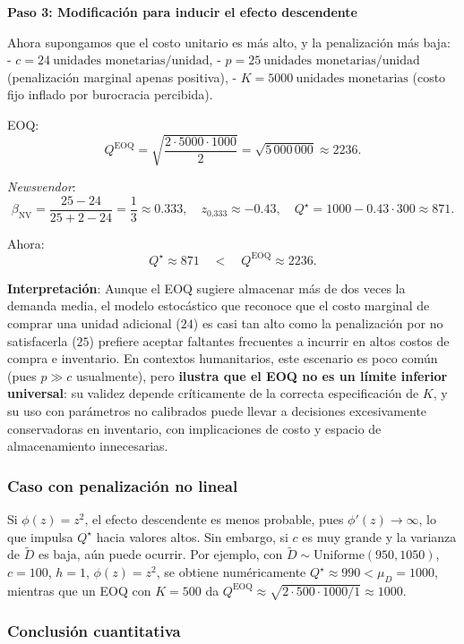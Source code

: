 \documentclass[
  spanish,
  us-letterpaper,
  DIV=11,
  numbers=noendperiod]{scrreprt}
\numberwithin{equation}{section}
\begin{document}
\textbf{Paso 3: Modificación para inducir el efecto descendente}

Ahora supongamos que el costo unitario es más alto, y la penalización
más baja: - \(c = 24~\text{unidades monetarias/unidad}\), -
\(p = 25~\text{unidades monetarias/unidad}\) (penalización marginal
apenas positiva), - \(K = 5000~\text{unidades monetarias}\) (costo fijo
inflado por burocracia percibida).

EOQ: \[
Q^{\text{EOQ}} = \sqrt{\frac{2 \cdot 5000 \cdot 1000}{2}} = \sqrt{5\,000\,000} \approx 2236.
\]

\emph{Newsvendor}: \[
\beta_{\text{NV}} = \frac{25 - 24}{25 + 2 - 24} = \frac{1}{3} \approx 0.333,
\quad z_{0.333} \approx -0.43,
\quad Q^\star = 1000 - 0.43 \cdot 300 \approx 871.
\]

Ahora: \[
Q^\star \approx 871 \quad < \quad Q^{\text{EOQ}} \approx 2236.
\]

\textbf{Interpretación}: Aunque el EOQ sugiere almacenar más de dos
veces la demanda media, el modelo estocástico que reconoce que el costo
marginal de comprar una unidad adicional (\(24\)) es casi tan alto como
la penalización por no satisfacerla (\(25\)) prefiere aceptar faltantes
frecuentes a incurrir en altos costos de compra e inventario. En
contextos humanitarios, este escenario es poco común (pues \(p \gg c\)
usualmente), pero \textbf{ilustra que el EOQ no es un límite inferior
universal}: su validez depende críticamente de la correcta
especificación de \(K\), y su uso con parámetros no calibrados puede
llevar a decisiones excesivamente conservadoras en inventario, con
implicaciones de costo y espacio de almacenamiento innecesarias.

\subsubsection{Caso con penalización no
lineal}\label{caso-con-penalizaciuxf3n-no-lineal}

Si \(\phi(z) = z^2\), el efecto descendente es menos probable, pues
\(\phi'(z) \to \infty\), lo que impulsa \(Q^\star\) hacia valores altos.
Sin embargo, si \(c\) es muy grande y la varianza de \(\tilde{D}\) es
baja, aún puede ocurrir. Por ejemplo, con
\(\tilde{D} \sim \text{Uniforme}(950, 1050)\), \(c = 100\), \(h = 1\),
\(\phi(z) = z^2\), se obtiene numéricamente
\(Q^\star \approx 990 < \mu_D = 1000\), mientras que un EOQ con
\(K = 500\) da
\(Q^{\text{EOQ}} \approx \sqrt{2 \cdot 500 \cdot 1000 / 1} \approx 1000\).

\subsubsection{Conclusión
cuantitativa}\label{conclusiuxf3n-cuantitativa}
\end{document}
